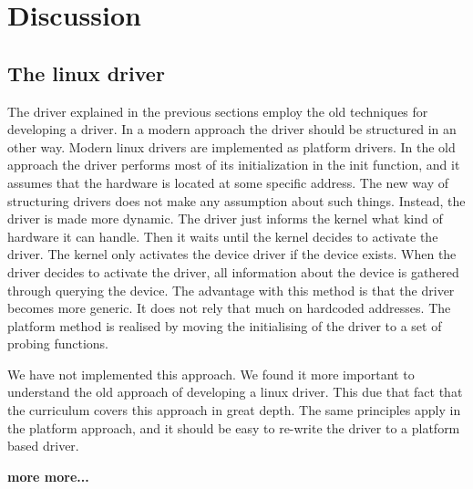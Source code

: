 \section{Discussion}


\subsection{The linux driver}
The driver explained in the previous sections employ the old techniques for developing a driver. In a modern approach the driver should be structured in an other way. Modern linux drivers are implemented as platform drivers. In the old approach the driver performs most of its initialization in the init function, and it assumes that the hardware is located at some specific address. The new way of structuring drivers does not make any assumption about such things. Instead, the driver is made more dynamic. The driver just informs the kernel what kind of hardware it can handle. Then it waits until the kernel decides to activate the driver. The kernel only activates the device driver if the device exists. When the driver decides to activate the driver, all information about the device is gathered through querying the device. The advantage with this method is that the driver becomes more generic. It does not rely that much on hardcoded addresses. The platform method is realised by moving the initialising  of the driver to a set of probing functions. 

We have not implemented this approach. We found it more important to understand the old approach of developing a linux driver. This due that fact that the curriculum covers this approach in great depth. The same principles apply in the platform approach, and it should be easy to re-write the driver to a platform based driver. 

{\bf more more...}









